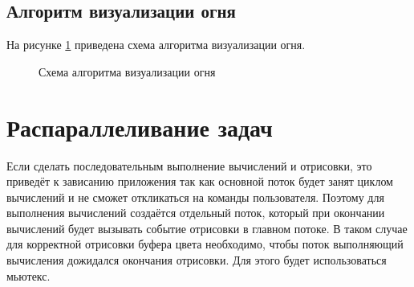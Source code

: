 \documentclass[a4paper,14pt]{report}
\begin{document}
\subsection{Алгоритм визуализации огня}
На рисунке \ref{fig:sh4} приведена схема алгоритма визуализации огня.
\begin{figure}[H]
 \caption{Схема алгоритма визуализации огня}
 \label{fig:sh4}
\end{figure}
\section{Распараллеливание задач}
Если сделать последовательным выполнение вычислений и отрисовки, это приведёт к зависанию приложения так как основной поток будет занят циклом вычислений и не сможет откликаться на команды пользователя.
Поэтому для выполнения вычислений создаётся отдельный поток, который при окончании вычислений будет вызывать событие отрисовки в главном потоке. 
В таком случае для корректной отрисовки буфера цвета необходимо, чтобы поток выполняющий вычисления дожидался окончания отрисовки. Для этого будет использоваться мьютекс.
\end{document}
